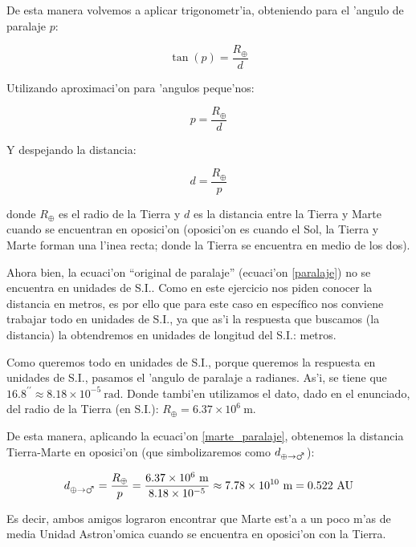 \documentclass{article}
\begin{document}
\begin{enumerate} [a)]
De esta manera volvemos a aplicar trigonometr'ia, obteniendo para el 'angulo de paralaje $p$:

\begin{equation*}
\tan (p) = \frac{R_\oplus}{d}
\end{equation*} 

Utilizando aproximaci'on para 'angulos peque'nos:

\begin{equation*}
p = \frac{R_\oplus}{d}
\end{equation*}

Y despejando la distancia:

\begin{equation} \label{marte_paralaje}
d = \frac{R_\oplus}{p}
\end{equation}

donde $R_\oplus$ es el radio de la Tierra y $d$ es la distancia entre la Tierra y Marte cuando se encuentran en oposici'on (oposici'on es cuando el Sol, la Tierra y Marte forman una l'inea recta; donde la Tierra se encuentra en medio de los dos).

Ahora bien, la ecuaci'on ``original de paralaje'' (ecuaci'on \eqref{paralaje}) no se encuentra en unidades de S.I.. Como en este ejercicio nos piden conocer la distancia en metros, es por ello que para este caso en específico nos conviene trabajar todo en unidades de S.I., ya que as'i la respuesta que buscamos (la distancia) la obtendremos en unidades de longitud del S.I.: metros.

Como queremos todo en unidades de S.I., porque queremos la respuesta en unidades de S.I., pasamos el 'angulo de paralaje a radianes. As'i, se tiene que $16.8^{\prime \prime} \approx 8.18 \times 10^{-5} \ \text{rad}$. Donde tambi'en utilizamos el dato, dado en el enunciado, del radio de la Tierra (en S.I.): $R_\oplus = 6.37 \times 10^{6} \ \text{m}$.

De esta manera, aplicando la ecuaci'on \eqref{marte_paralaje}, obtenemos la distancia Tierra-Marte en oposici'on (que simbolizaremos como $d_{\oplus \rightarrow \mars}$):

\begin{equation}
d_{\oplus \rightarrow \mars} = \frac{R_\oplus}{p} = \frac{6.37 \times 10^{6} \ \text{m}}{8.18 \times 10^{-5}} \approx 7.78 \times 10^{10} \ \text{m} = 0.522 \ \text{AU} 
\end{equation}

Es decir, ambos amigos lograron encontrar que Marte est'a a un poco m'as de media Unidad Astron'omica cuando se encuentra en oposici'on con la Tierra.

\end{enumerate}
\end{document}
